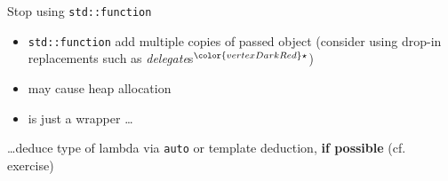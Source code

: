 \begin{frame}[fragile]{Stop using \texttt{std::function}}

    \begin{itemize}
        \item \texttt{std::function} add multiple copies of passed object (consider using drop-in replacements such as \textit{delegate}s${}^{\color{vertexDarkRed}\star}$)
        \item may cause heap allocation
        \item is just a wrapper \ldots
    \end{itemize}
    \ldots deduce type of lambda via \texttt{auto} or template deduction, \textbf{if possible} (cf. exercise)

    \vspace{5mm}

    
\end{frame}
